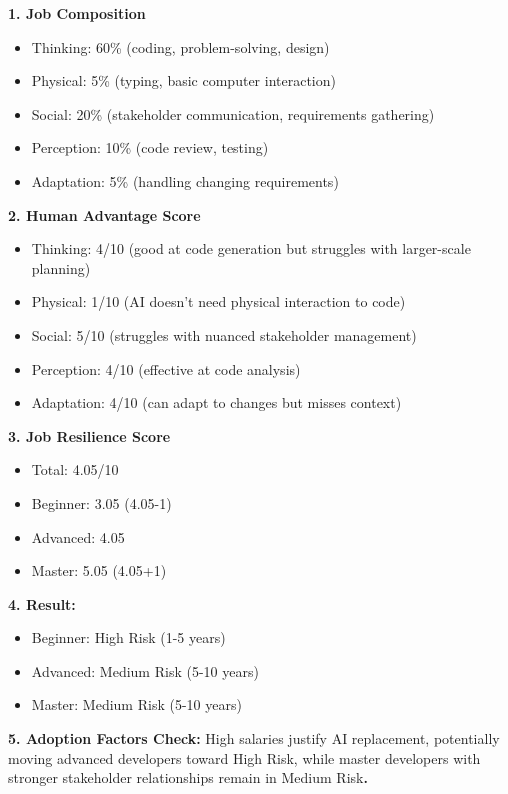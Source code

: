 \documentclass[
  11pt,
]{article}
\providecommand{\tightlist}{%
  \setlength{\itemsep}{0pt}\setlength{\parskip}{0pt}}
\begin{document}
\textbf{1. Job Composition}

\begin{itemize}
\tightlist
\item
  Thinking: 60\% (coding, problem-solving, design)
\item
  Physical: 5\% (typing, basic computer interaction)
\item
  Social: 20\% (stakeholder communication, requirements gathering)
\item
  Perception: 10\% (code review, testing)
\item
  Adaptation: 5\% (handling changing requirements)
\end{itemize}

\textbf{2. Human Advantage Score}

\begin{itemize}
\tightlist
\item
  Thinking: 4/10 (good at code generation but struggles with
  larger-scale planning)
\item
  Physical: 1/10 (AI doesn't need physical interaction to code)
\item
  Social: 5/10 (struggles with nuanced stakeholder management)
\item
  Perception: 4/10 (effective at code analysis)
\item
  Adaptation: 4/10 (can adapt to changes but misses context)
\end{itemize}

\textbf{3. Job Resilience Score}

\begin{itemize}
\tightlist
\item
  Total: 4.05/10
\item
  Beginner: 3.05 (4.05-1)
\item
  Advanced: 4.05
\item
  Master: 5.05 (4.05+1)
\end{itemize}

\textbf{4. Result:}

\begin{itemize}
\tightlist
\item
  Beginner: High Risk (1-5 years)
\item
  Advanced: Medium Risk (5-10 years)
\item
  Master: Medium Risk (5-10 years)
\end{itemize}

\textbf{5. Adoption Factors Check: }High salaries justify AI
replacement, potentially moving advanced developers toward High Risk,
while master developers with stronger stakeholder relationships remain
in Medium Risk\textbf{.}
\end{document}
